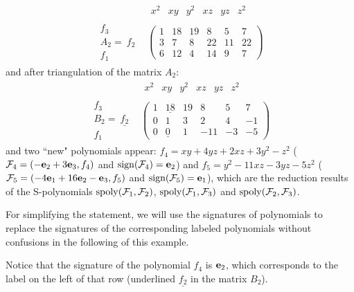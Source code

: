 \documentclass[preprint,authoryear,3p,12pt]{elsarticle}
\def\eb{{\bf e}}
\def\sp{{\rm spoly}}
\def\s{{\rm{sign}}}
\begin{document}
\[
\begin{array}{cc}
 & \begin{array}{cccccc}
x^2 & xy & y^2 & xz & yz & z^2
 \end{array}\\
\begin{array}{r}
f_3 \\ A_2 = \ f_2 \\ f_1
\end{array} &
\left(
\begin{array}{cccccc}
1 & 18 & 19 & 8 & 5 & 7\\
3 & 7 & 8 & 22 & 11 & 22\\
6 & 12 & 4 & 14 & 9 & 7
\end{array}
\right)
\end{array}
\]
and after triangulation of the matrix $A_2$:
\[
\begin{array}{cc}
 & \begin{array}{cccccc}
x^2 & xy & y^2 & xz & yz & z^2
 \end{array}\\
\begin{array}{r}
f_3 \\ B_2 = \ \underline{f_2} \\ f_1
\end{array} &
\left(
\begin{array}{cccccc}
1 & \underline{18} & 19 & 8 & 5 & 7\\
0 & 1 & 3 & 2 & 4 & -1\\
0 & \underline{0} & 1 & -11 & -3 & -5
\end{array}
\right)
\end{array}
\]
and two ``new" polynomials appear: $f_4=xy+4yz+2xz+3y^2-z^2$
(${\mathcal F}_4=(-\eb_2+3\eb_3, f_4)$ and $\s({\mathcal
F}_4)=\eb_2$) and $f_5=y^2-11xz-3yz-5z^2$ (${\mathcal
F}_5=(-4\eb_1+16\eb_2-\eb_3, f_5)$ and $\s({\mathcal F}_5)=\eb_1$),
which are the reduction results of the S-polynomials $\sp({\mathcal
F}_1, {\mathcal F}_2)$, $\sp({\mathcal F}_1, {\mathcal F}_3)$ and
$\sp({\mathcal F}_2, {\mathcal F}_3)$.

For simplifying the statement, we will use the signatures of polynomials to replace the signatures of the
 corresponding labeled polynomials without  confusions in the following of this example.

 Notice that the signature of
the polynomial $f_4$ is $\eb_2$, which corresponds to the label on
the left of that row (underlined $\underline{f_2}$ in the matrix
$B_2$).
\end{document}
